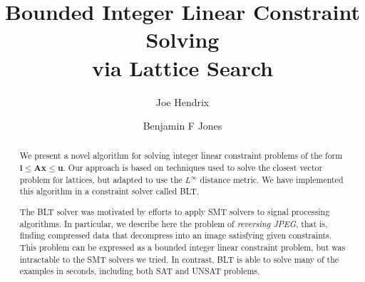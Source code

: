 \documentclass{easychair}
\renewcommand\v[1]{\boldsymbol{#1}}
\newcommand\mat[1]{\mathbf{#1}}
\newcommand\linf{L^\infty}   %
\theoremstyle{plain}
\begin{document}
\title{Bounded Integer Linear Constraint Solving \\
       via Lattice Search}
\author{Joe Hendrix \and Benjamin F Jones}

\maketitle

\begin{abstract}

\setlength{\parskip}{6pt}

\noindent{}We present a novel algorithm for solving integer linear constraint
problems of the form $\v{l} \le \mat{A} \v{x} \le \v{u}$. Our approach is based
on techniques used to solve the closest vector problem for lattices, but adapted
to use the $\linf{}$ distance metric. We have implemented this algorithm in a
constraint solver called BLT.

\noindent{}The BLT solver was motivated by efforts to apply SMT solvers to
signal processing algorithms.  In particular, we describe here the problem of
\emph{reversing JPEG}, that is, finding compressed data that decompress into an
image satisfying given constraints.  This problem can be expressed as a bounded
integer linear constraint problem, but was intractable to the SMT solvers we
tried.  In contrast, BLT is able to solve many of the examples in seconds,
including both SAT and UNSAT problems.

\end{abstract}









\end{document}
